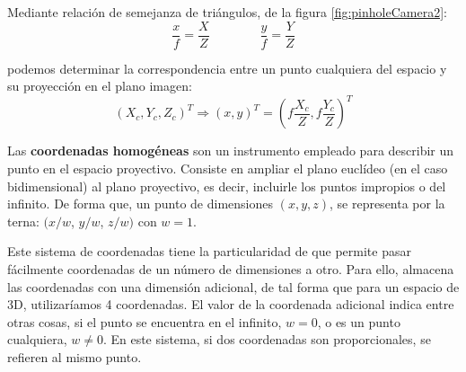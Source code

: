 Mediante relación de semejanza de triángulos, de la figura \ref{fig:pinholeCamera2}: 
\begin{equation}\label{eq:semejanza}
\dfrac{x}{f} = \dfrac{X}{Z} \quad \quad \quad \quad \dfrac{y}{f} = \dfrac{Y}{Z} 
\end{equation}

podemos determinar la correspondencia entre un punto cualquiera del espacio y su proyección en el plano imagen:
\begin{equation}\label{eq:proyeccion}
  (X_c , Y_c , Z_c )^T \Longrightarrow  (x, y)^T = (f \dfrac{X_c}{Z}, f \dfrac{Y_c}{Z})^T
\end{equation}

Las \textbf{coordenadas homogéneas} son un instrumento empleado para describir un punto en el espacio proyectivo. Consiste en ampliar el plano euclídeo (en el caso bidimensional) al plano proyectivo, es decir, incluirle los puntos impropios o del infinito. De forma que, un punto de dimensiones $(x, y, z)$, se representa por la terna: $(x/w$, $y/w$, $z/w)$ con $w=1$. %

Este sistema de coordenadas tiene la particularidad de que permite pasar fácilmente coordenadas de un número de dimensiones a otro. Para ello, almacena las coordenadas con una dimensión adicional, de tal forma que para un espacio de 3D, utilizaríamos 4 coordenadas. El valor de la coordenada adicional indica entre otras cosas, si el punto se encuentra en el infinito, $w=0$, o es un punto cualquiera, $w \neq 0$. En este sistema, si dos coordenadas son proporcionales, se refieren al mismo punto.

